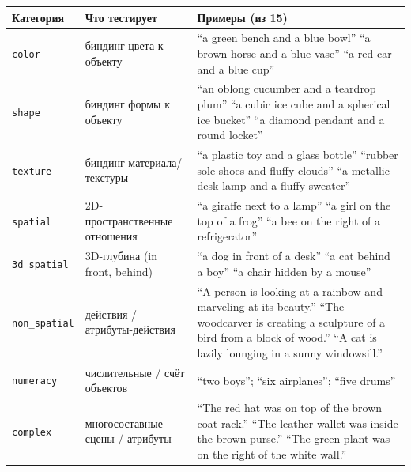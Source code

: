 \documentclass[11pt,a4paper]{article}
\begin{document}
\begin{center}
\renewcommand{\arraystretch}{1.25}
\footnotesize
\begin{tabularx}{\textwidth}{l l X}
\toprule
Категория & Что тестирует & Примеры (из 15) \\
\midrule
\texttt{color}        & биндинг цвета к объекту           & ``a green bench and a blue bowl'' \newline ``a brown horse and a blue vase'' \newline ``a red car and a blue cup'' \\
\texttt{shape}        & биндинг формы к объекту           & ``an oblong cucumber and a teardrop plum'' \newline ``a cubic ice cube and a spherical ice bucket'' \newline ``a diamond pendant and a round locket'' \\
\texttt{texture}      & биндинг материала/текстуры        & ``a plastic toy and a glass bottle'' \newline ``rubber sole shoes and fluffy clouds'' \newline ``a metallic desk lamp and a fluffy sweater'' \\
\texttt{spatial}      & 2D-пространственные отношения     & ``a giraffe next to a lamp'' \newline ``a girl on the top of a frog'' \newline ``a bee on the right of a refrigerator'' \\
\texttt{3d\_spatial}  & 3D-глубина (in front, behind)     & ``a dog in front of a desk'' \newline ``a cat behind a boy'' \newline ``a chair hidden by a mouse'' \\
\texttt{non\_spatial} & действия / атрибуты-действия      & ``A person is looking at a rainbow and marveling at its beauty.'' \newline ``The woodcarver is creating a sculpture of a bird from a block of wood.'' \newline ``A cat is lazily lounging in a sunny windowsill.'' \\
\texttt{numeracy}     & числительные / счёт объектов      & ``two boys''; ``six airplanes''; ``five drums'' \\
\texttt{complex}      & многосоставные сцены / атрибуты   & ``The red hat was on top of the brown coat rack.'' \newline ``The leather wallet was inside the brown purse.'' \newline ``The green plant was on the right of the white wall.'' \\
\bottomrule
\end{tabularx}
\end{center}
\end{document}
